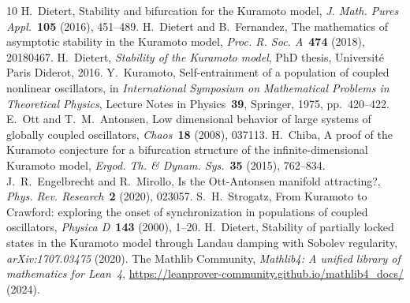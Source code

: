 \documentclass[11pt,a4paper]{article}
\theoremstyle{definition}
\begin{document}
\begin{thebibliography}{10}
 H.~Dietert, Stability and bifurcation for the Kuramoto model, \emph{J. Math. Pures Appl.}~\textbf{105} (2016), 451--489.
 H.~Dietert and B.~Fernandez, The mathematics of asymptotic stability in the Kuramoto model, \emph{Proc. R. Soc. A}~\textbf{474} (2018), 20180467.
 H.~Dietert, \emph{Stability of the Kuramoto model}, PhD thesis, Universit\'e Paris Diderot, 2016.
 Y.~Kuramoto, Self-entrainment of a population of coupled nonlinear oscillators, in \emph{International Symposium on Mathematical Problems in Theoretical Physics}, Lecture Notes in Physics~\textbf{39}, Springer, 1975, pp.~420--422.
 E.~Ott and T.~M.~Antonsen, Low dimensional behavior of large systems of globally coupled oscillators, \emph{Chaos}~\textbf{18} (2008), 037113.
 H.~Chiba, A proof of the Kuramoto conjecture for a bifurcation structure of the infinite-dimensional Kuramoto model, \emph{Ergod. Th. \& Dynam. Sys.}~\textbf{35} (2015), 762--834.
 J.~R.~Engelbrecht and R.~Mirollo, Is the Ott-Antonsen manifold attracting?, \emph{Phys. Rev. Research}~\textbf{2} (2020), 023057.
 S.~H.~Strogatz, From Kuramoto to Crawford: exploring the onset of synchronization in populations of coupled oscillators, \emph{Physica D}~\textbf{143} (2000), 1--20.
 H.~Dietert, Stability of partially locked states in the Kuramoto model through Landau damping with Sobolev regularity, \emph{arXiv:1707.03475} (2020).
 The Mathlib Community, \emph{Mathlib4: A unified library of mathematics for Lean~4}, \url{https://leanprover-community.github.io/mathlib4_docs/} (2024).
\end{thebibliography}
\end{document}
